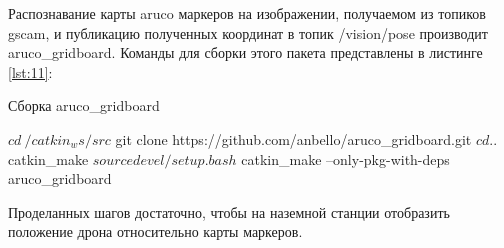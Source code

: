 Распознавание карты aruco маркеров на изображении, получаемом из топиков gscam, и публикацию полученных координат в топик /vision/pose производит aruco\_gridboard. Команды для сборки этого пакета представлены в листинге \ref{lst:11}:
\begin{Program}[H]
	\caption{Сборка aruco\_gridboard} \label{lst:11}
	\begin{MyCode}	
	$ cd ~/catkin_ws/src
	$ git clone https://github.com/anbello/aruco_gridboard.git
	$ cd ..
	$ catkin_make
	$ source devel/setup.bash
	$ catkin_make --only-pkg-with-deps aruco_gridboard
	\end{MyCode}
\end{Program}

Проделанных шагов достаточно, чтобы на наземной станции отобразить положение дрона относительно карты маркеров.
